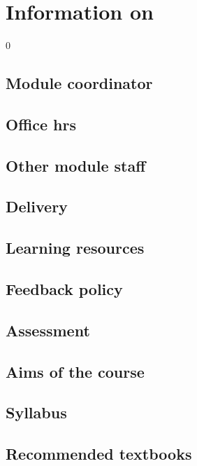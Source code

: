 \renewcommand{\prevpart}{0 }
\renewcommand{\thispart}{0 }
\renewcommand{\nextpart}{0 }



\section{Information on \modulename}{0}

\subsection{Module coordinator}


\subsection{Office hrs}


\subsection{Other module staff}


\subsection{Delivery}


\subsection{Learning resources}

\subsection{Feedback policy}


\subsection{Assessment}


\subsection{Aims of the course}


\subsection{Syllabus}


\subsection{Recommended textbooks}


